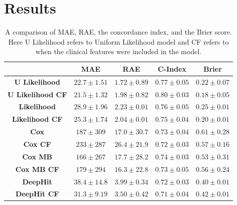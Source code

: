 \vspace{-0.5cm}

\section{Results} \label{sec:results}   
    \begin{table}
        \vspace{-0.5cm}
        
        \centering
        
        \captionsetup{singlelinecheck=false, justification=centering}
        \caption{
            A comparison of \gls{MAE}, \gls{RAE}, the concordance index, and the Brier score. Here U Likelihood refers to Uniform Likelihood model and CF refers to when the clinical features were included in the model.
        }
        
        \vspace{-0.25cm}
        
        \resizebox*{1.0\linewidth}{0.1\textheight}
        {
            \begin{tabular}{||c|cc|c|c||}
                \hline
                                            & \textbf{\gls{MAE}} & \textbf{\gls{RAE}} & \textbf{C-Index}  & \textbf{Brier}    \\
                \hline
                \textbf{U Likelihood}       & $22.7\pm1.51$      & $1.72\pm0.89$      & $0.77\pm0.05$     & $0.22\pm0.07$      \\
                \textbf{U Likelihood CF}    & $21.5\pm1.32$      & $1.98\pm0.82$      & $0.80\pm0.03$     & $0.18\pm0.05$      \\
                \textbf{Likelihood}         & $28.9\pm1.96$      & $2.23\pm0.01$      & $0.76\pm0.05$     & $0.25\pm0.01$      \\
                \textbf{Likelihood CF}      & $25.3\pm1.74$      & $2.04\pm0.01$      & $0.75\pm0.04$     & $0.20\pm0.01$      \\
                \hline
                \textbf{Cox}                & $187 \pm309 $      & $17.0\pm30.7$      & $0.73\pm0.04$     & $0.61\pm0.28$      \\
                \textbf{Cox CF}             & $233 \pm287 $      & $26.4\pm21.9$      & $0.72\pm0.03$     & $0.57\pm0.16$      \\
                \textbf{Cox \gls{MB}}       & $166 \pm267 $      & $17.7\pm28.2$      & $0.74\pm0.03$     & $0.53\pm0.31$      \\
                \textbf{Cox \gls{MB} CF}    & $179 \pm294 $      & $16.3\pm22.8$      & $0.73\pm0.05$     & $0.56\pm0.24$      \\
                \hline
                \textbf{DeepHit}            & $38.4\pm14.8$      & $3.99\pm0.34$      & $0.72\pm0.03$     & $0.40\pm0.01$      \\
                \textbf{DeepHit CF}         & $31.3\pm9.19$      & $3.50\pm0.42$      & $0.71\pm0.04$     & $0.42\pm0.01$      \\
                \hline
            \end{tabular}
        }
        \label{tab:table}
        

\end{table}
